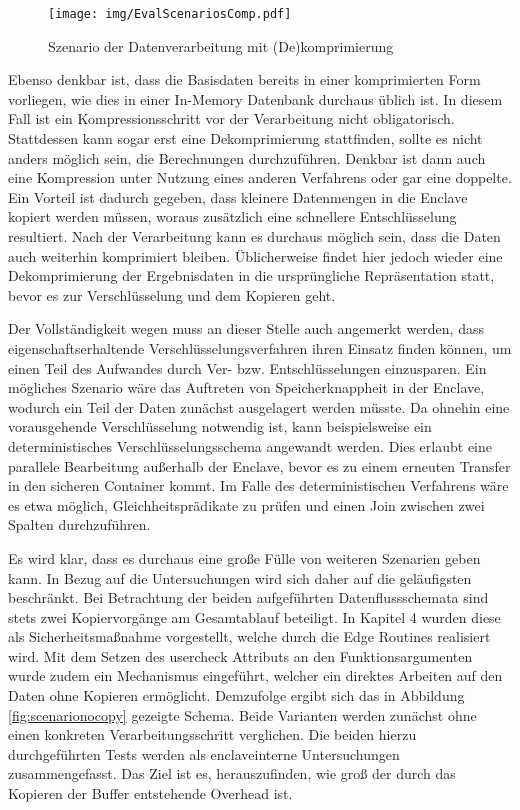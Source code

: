 \begin{figure}[h]
	\texttt{[image: img/EvalScenariosComp.pdf]}
	\centering
	\caption{Szenario der Datenverarbeitung mit (De)komprimierung}
	\label{fig:scenariocomp}
\end{figure}

Ebenso denkbar ist, dass die Basisdaten bereits in einer komprimierten Form vorliegen, wie dies in einer In-Memory Datenbank durchaus üblich ist. In diesem Fall ist ein Kompressionsschritt vor der Verarbeitung nicht obligatorisch. Stattdessen kann sogar erst eine Dekomprimierung stattfinden, sollte es nicht anders möglich sein, die Berechnungen durchzuführen. Denkbar ist dann auch eine Kompression unter Nutzung eines anderen Verfahrens oder gar eine doppelte. Ein Vorteil ist dadurch gegeben, dass kleinere Datenmengen in die Enclave kopiert werden müssen, woraus zusätzlich eine schnellere Entschlüsselung resultiert. Nach der Verarbeitung kann es durchaus möglich sein, dass die Daten auch weiterhin komprimiert bleiben. Üblicherweise findet hier jedoch wieder eine Dekomprimierung der Ergebnisdaten in die ursprüngliche Repräsentation statt, bevor es zur Verschlüsselung und dem Kopieren geht.

Der Vollständigkeit wegen muss an dieser Stelle auch angemerkt werden, dass eigenschaftserhaltende Verschlüsselungsverfahren ihren Einsatz finden können, um einen Teil des Aufwandes durch Ver- bzw. Entschlüsselungen einzusparen. Ein mögliches Szenario wäre das Auftreten von Speicherknappheit in der Enclave, wodurch ein Teil der Daten zunächst ausgelagert werden müsste. Da ohnehin eine vorausgehende Verschlüsselung notwendig ist, kann beispielsweise ein deterministisches Verschlüsselungsschema angewandt werden. Dies erlaubt eine parallele Bearbeitung außerhalb der Enclave, bevor es zu einem erneuten Transfer in den sicheren Container kommt. Im Falle des deterministischen Verfahrens wäre es etwa möglich, Gleichheitsprädikate zu prüfen und einen Join zwischen zwei Spalten durchzuführen.

Es wird klar, dass es durchaus eine große Fülle von weiteren Szenarien geben kann. In Bezug auf die Untersuchungen wird sich daher auf die geläufigsten beschränkt. Bei Betrachtung der beiden aufgeführten Datenflussschemata sind stets zwei Kopiervorgänge am Gesamtablauf beteiligt. In Kapitel 4 wurden diese als Sicherheitsmaßnahme vorgestellt, welche durch die Edge Routines realisiert wird. Mit dem Setzen des user\textunderscore check Attributs an den Funktionsargumenten wurde zudem ein Mechanismus eingeführt, welcher ein direktes Arbeiten auf den Daten ohne Kopieren ermöglicht. Demzufolge ergibt sich das in Abbildung \ref{fig:scenarionocopy} gezeigte Schema. Beide Varianten werden zunächst ohne einen konkreten Verarbeitungsschritt verglichen. Die beiden hierzu durchgeführten Tests werden als enclaveinterne Untersuchungen zusammengefasst. Das Ziel ist es, herauszufinden, wie groß der durch das Kopieren der Buffer entstehende Overhead ist.

